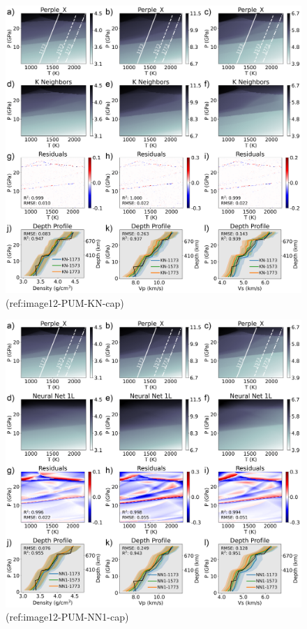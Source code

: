 \documentclass[draft]{agujournal2018}
\begin{document}
\begin{figure}[htbp]

{\centering \includegraphics[width=1\linewidth,]{image12-PUM-KN} 

}

\caption{(ref:image12-PUM-KN-cap)}\label{fig:image12-PUM-KN}
\end{figure}



\begin{figure}[htbp]

{\centering \includegraphics[width=1\linewidth,]{image12-PUM-NN1} 

}

\caption{(ref:image12-PUM-NN1-cap)}\label{fig:image12-PUM-NN1}
\end{figure}
\end{document}
